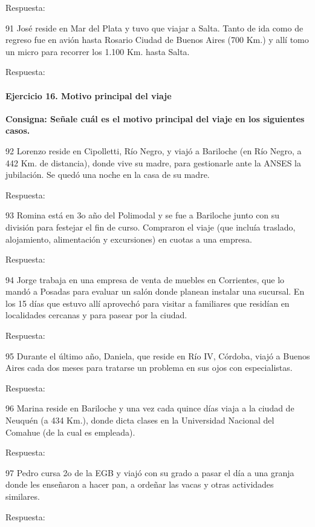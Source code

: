 \documentclass[
  openany]{book}
\begin{document}
Respuesta:

91 José reside en Mar del Plata y tuvo que viajar a Salta. Tanto de ida como de regreso fue en avión hasta Rosario Ciudad de Buenos Aires (700 Km.) y allí tomo un micro para recorrer los 1.100 Km. hasta Salta.

Respuesta:

\hypertarget{ejercicio-16.-motivo-principal-del-viaje}{%
\paragraph{Ejercicio 16. Motivo principal del viaje}\label{ejercicio-16.-motivo-principal-del-viaje}}

\textbf{Consigna: Señale cuál es el motivo principal del viaje en los siguientes casos.}

92 Lorenzo reside en Cipolletti, Río Negro, y viajó a Bariloche (en Río Negro, a 442 Km. de distancia), donde vive su madre, para gestionarle ante la ANSES la jubilación. Se quedó una noche en la casa de su madre.

Respuesta:

93 Romina está en 3o año del Polimodal y se fue a Bariloche junto con su división para festejar el fin de curso. Compraron el viaje (que incluía traslado, alojamiento, alimentación y excursiones) en cuotas a una empresa.

Respuesta:

94 Jorge trabaja en una empresa de venta de muebles en Corrientes, que lo mandó a Posadas para evaluar un salón donde planean instalar una sucursal. En los 15 días que estuvo allí aprovechó para visitar a familiares que residían en localidades cercanas y para pasear por la ciudad.

Respuesta:

95 Durante el último año, Daniela, que reside en Río IV, Córdoba, viajó a Buenos Aires cada dos meses para tratarse un problema en sus ojos con especialistas.

Respuesta:

96 Marina reside en Bariloche y una vez cada quince días viaja a la ciudad de Neuquén (a 434 Km.), donde dicta clases en la Universidad Nacional del Comahue (de la cual es empleada).

Respuesta:

97 Pedro cursa 2o de la EGB y viajó con su grado a pasar el día a una granja donde les enseñaron a hacer pan, a ordeñar las vacas y otras actividades similares.

Respuesta:
\end{document}
